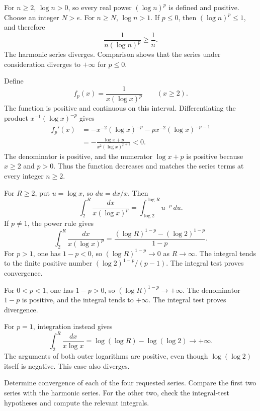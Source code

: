 For $n\ge2$, $\log n>0$, so every real power $(\log n)^p$ is
defined and positive. Choose an integer $N>e$. For $n\ge N$,
$\log n>1$. If $p\le0$, then $(\log n)^p\le1$, and therefore
\[
 \frac{1}{n(\log n)^p}\ge\frac1n.
\]
The harmonic series diverges. Comparison shows that the series
under consideration diverges to $+\infty$ for $p\le0$.

Define
\[
 f_p(x)=\frac{1}{x(\log x)^p}\qquad(x\ge2).
\]
The function is positive and continuous on this interval.
Differentiating the product $x^{-1}(\log x)^{-p}$ gives
\[
 \begin{aligned}
 f_p'(x)
 &=-x^{-2}(\log x)^{-p}
   -p x^{-2}(\log x)^{-p-1}\\
 &=-\frac{\log x+p}{x^2(\log x)^{p+1}}<0.
 \end{aligned}
\]
The denominator is positive, and the numerator $\log x+p$ is
positive because $x\ge2$ and $p>0$. Thus the function decreases
and matches the series terms at every integer $n\ge2$.

For $R\ge2$, put $u=\log x$, so $du=dx/x$. Then
\[
 \int_2^R\frac{dx}{x(\log x)^p}
 =\int_{\log2}^{\log R}u^{-p}\,du.
\]
If $p\ne1$, the power rule gives
\[
 \int_2^R\frac{dx}{x(\log x)^p}
 =\frac{(\log R)^{1-p}-(\log2)^{1-p}}{1-p}.
\]
For $p>1$, one has $1-p<0$, so $(\log R)^{1-p}\to0$ as
$R\to\infty$. The integral tends to the finite positive number
$(\log2)^{1-p}/(p-1)$. The integral test proves convergence.

For $0<p<1$, one has $1-p>0$, so $(\log R)^{1-p}\to+\infty$.
The denominator $1-p$ is positive, and the integral tends to
$+\infty$. The integral test proves divergence.

For $p=1$, integration instead gives
\[
 \int_2^R\frac{dx}{x\log x}
 =\log(\log R)-\log(\log2)\longrightarrow+\infty.
\]
The arguments of both outer logarithms are positive, even though
$\log(\log2)$ itself is negative. This case also diverges.

\goal Determine convergence of each of the four requested series.
\idea Compare the first two series with the harmonic series.
For the other two, check the integral-test hypotheses and compute
the relevant integrals.


